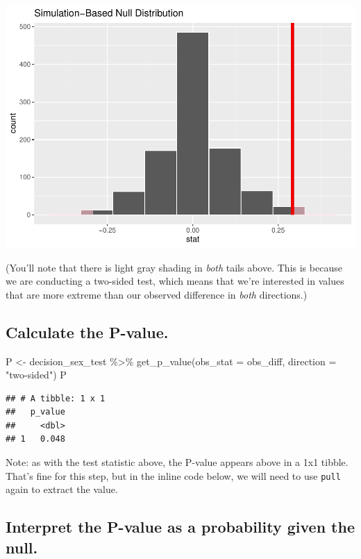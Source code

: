\documentclass[
]{book}
\newenvironment{Shaded}{\begin{snugshade}}{\end{snugshade}}
\newcommand{\AttributeTok}[1]{\textcolor[rgb]{0.77,0.63,0.00}{#1}}
\newcommand{\FunctionTok}[1]{\textcolor[rgb]{0.00,0.00,0.00}{#1}}
\newcommand{\NormalTok}[1]{#1}
\newcommand{\OtherTok}[1]{\textcolor[rgb]{0.56,0.35,0.01}{#1}}
\newcommand{\SpecialCharTok}[1]{\textcolor[rgb]{0.00,0.00,0.00}{#1}}
\newcommand{\StringTok}[1]{\textcolor[rgb]{0.31,0.60,0.02}{#1}}
\begin{document}
\includegraphics{intro_stats_files/figure-latex/unnamed-chunk-279-1.pdf}

(You'll note that there is light gray shading in \emph{both} tails above. This is because we are conducting a two-sided test, which means that we're interested in values that are more extreme than our observed difference in \emph{both} directions.)

\hypertarget{hypothesis1-ex-calculate-p}{%
\subsection{Calculate the P-value.}\label{hypothesis1-ex-calculate-p}}

\begin{Shaded}
\begin{Highlighting}[]
\NormalTok{P }\OtherTok{\textless{}{-}}\NormalTok{ decision\_sex\_test }\SpecialCharTok{\%\textgreater{}\%}
  \FunctionTok{get\_p\_value}\NormalTok{(}\AttributeTok{obs\_stat =}\NormalTok{ obs\_diff, }\AttributeTok{direction =} \StringTok{"two{-}sided"}\NormalTok{)}
\NormalTok{P}
\end{Highlighting}
\end{Shaded}

\begin{verbatim}
## # A tibble: 1 x 1
##   p_value
##     <dbl>
## 1   0.048
\end{verbatim}

Note: as with the test statistic above, the P-value appears above in a 1x1 tibble. That's fine for this step, but in the inline code below, we will need to use \texttt{pull} again to extract the value.

\hypertarget{hypothesis1-ex-interpret-p}{%
\subsection{Interpret the P-value as a probability given the null.}\label{hypothesis1-ex-interpret-p}}
\end{document}
